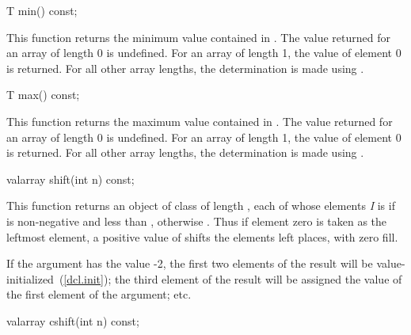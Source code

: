 %
\begin{itemdecl}
T min() const;
\end{itemdecl}

\begin{itemdescr}
\pnum
This function returns the minimum value contained in
.
The value returned for an array of length 0 is undefined.
For an array
of length 1, the value of element 0 is returned.
For all other array
lengths, the determination is made using
.
\end{itemdescr}

%
\begin{itemdecl}
T max() const;
\end{itemdecl}

\begin{itemdescr}
\pnum
This function returns the maximum value contained in
.
The value returned for an array of length 0 is undefined.
For an array
of length 1, the value of element 0 is returned.
For all other array
lengths, the determination is made using
.
\end{itemdescr}

%
\begin{itemdecl}
valarray shift(int n) const;
\end{itemdecl}

\begin{itemdescr}
\pnum
This function returns an object of class
of length
,
each of whose elements
\textit{I}
is
if
is non-negative and less than
,
otherwise
.
Thus if element zero is taken as the leftmost element,
a positive value of  shifts the elements left 
places, with zero fill.

\pnum
\begin{example}
If the argument has the value -2,
the first two elements of the result will be value-initialized~(\ref{dcl.init}); the third element of the result will be assigned the value
of the first element of the argument; etc.
\end{example}
\end{itemdescr}

%
\begin{itemdecl}
valarray cshift(int n) const;
\end{itemdecl}

